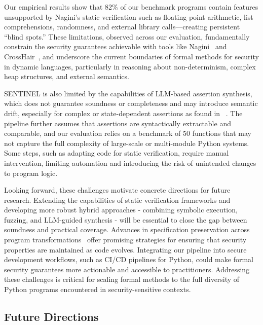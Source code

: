 \documentclass[8pt]{extarticle}
\begin{document}
Our empirical results show that 82\% of our benchmark programs contain features unsupported by Nagini’s static verification such as floating-point arithmetic, list comprehensions, randomness, and external library calls—creating persistent “blind spots.” These limitations, observed across our evaluation, fundamentally constrain the security guarantees achievable with tools like Nagini~\cite{eilers2018} and CrossHair~\cite{CrossHairTool}, and underscore the current boundaries of formal methods for security in dynamic languages, particularly in reasoning about non-determinism, complex heap structures, and external semantics.

SENTINEL is also limited by the capabilities of LLM-based assertion synthesis, which does not guarantee soundness or completeness and may introduce semantic drift, especially for complex or state-dependent assertions as found in ~\cite{zhang2024, Torkamani2024-Assertify, Pulavarthi2024-LLM-HW-Assertions}. The pipeline further assumes that assertions are syntactically extractable and comparable, and our evaluation relies on a benchmark of 50 functions that may not capture the full complexity of large-scale or multi-module Python systems. Some steps, such as adapting code for static verification, require manual intervention, limiting automation and introducing the risk of unintended changes to program logic. 

Looking forward, these challenges motivate concrete directions for future research. Extending the capabilities of static verification frameworks and developing more robust hybrid approaches - combining symbolic execution, fuzzing, and LLM-guided synthesis \cite{Liu2023-LLM-Sym-Inv} - will be essential to close the gap between soundness and practical coverage. Advances in specification preservation across program transformations~\cite{KoenigShao2021CompCertO} offer promising strategies for ensuring that security properties are maintained as code evolves. Integrating our pipeline into secure development workflows, such as CI/CD pipelines for Python, could make formal security guarantees more actionable and accessible to practitioners. Addressing these challenges is critical for scaling formal methods to the full diversity of Python programs encountered in security-sensitive contexts.

\subsection{Future Directions}
\end{document}
